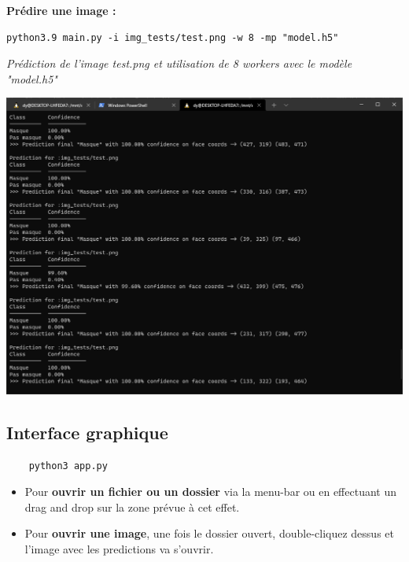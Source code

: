 \textbf{Prédire une image :} 

\begin{verbatim}
python3.9 main.py -i img_tests/test.png -w 8 -mp "model.h5"
\end{verbatim}

\textit{Prédiction de l'image test.png et utilisation de 8 workers avec le modèle "model.h5"}

\begin{center}
    \includegraphics[scale=0.5]{resources/command_line_prediction.png}
\end{center}

\clearpage


\subsection{Interface graphique}

\begin{verbatim}
    python3 app.py
\end{verbatim}
\begin{itemize}
    \item Pour \textbf{ouvrir un fichier ou un dossier} via la menu-bar ou en effectuant un drag and drop sur la zone prévue à cet effet.
    \item Pour \textbf{ouvrir une image}, une fois le dossier ouvert, double-cliquez dessus et l'image avec les predictions va s'ouvrir.
\end{itemize}

